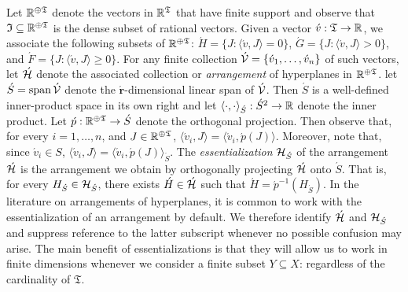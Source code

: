 \documentclass[12pt,a4paper,twoside]{article}
\newcommand{\spann}{\operatorname{span}}
\newcommand{\mbbtpp}{{\mathfrak{T}}}
\newcommand{\mbbjpp}{\mathfrak{I}}
\begin{document}
\begin{appendices}
Let $\R^{\oplus\mbbtpp}$ denote the vectors in $\R^{\mbbtpp}$ that have finite
support and observe that $\mbbjpp \subseteq \R^{\oplus\mbbtpp}$ is the dense
subset of rational vectors.  Given a vector $\acute{v}: \mbbtpp \rightarrow
\R$, we associate the following subsets of $\R^{\oplus\mbbtpp}$: $\acute H =
\{J : \langle \acute v , J \rangle = 0 \}$, $\acute G = \{J : \langle \acute v,
J \rangle > 0\}$, and $\acute F = \{J : \langle \acute v, J \rangle \geq 0\}$.
For any finite collection $\acute{\mathcal V} = \{\acute{v}_1, \dots, \acute{v}_n\}$
of such vectors, let $\acute{\mathcal H}$ denote the associated collection or
\emph{arrangement} of hyperplanes in $\R^{\oplus\mbbtpp}$. let $\acute{S} =
\spann \acute{\mc V}$ denote the $\acute{\mathbf{r}}$-dimensional linear span
of $\acute{\mathcal V}$. Then $\acute S$ is a well-defined inner-product space in
its own right and let $\langle \cdot , \cdot \rangle_{\acute{S}}: \acute{S}^2
\rightarrow \mathbb R$ denote the inner product. Let $\acute{p}: \R^{\oplus\mbbtpp}
\rightarrow \acute{S}$ denote the orthogonal projection. Then observe that, for
every $i = 1, \dots, n$, and $J \in \R^{\oplus\mbbtpp}$, $\langle \acute{v}_i,
J \rangle = \langle \acute{v}_i, \acute{p}(J)\rangle$.  Moreover, note that,
since $\acute{v}_i \in S$, $\langle \acute{v}_i, J \rangle = \langle
\acute{v}_i, \acute{p}(J) \rangle_{\acute{S}}$.  The \emph{essentialization}
${\mathcal H}_{\acute{S}}$ of the arrangement $\acute{\mathcal H}$ is the arrangement we
obtain by orthogonally projecting $\acute{\mathcal H}$ onto $\acute{S}$.  That is,
for every $H_{\acute{S}} \in {\mathcal H}_{\acute{S}}$, there exists $\acute{H} \in
\acute{\mathcal H}$ such that $\acute{H} = \acute{p}^{-1}(H_{\acute{S}})$.  In the
literature on arrangements of hyperplanes, it is common to work with the
essentialization of an arrangement by default.  We therefore identify
$\acute{\mathcal H}$ and $\mathcal{H}_{\acute{S}}$ and suppress reference to the latter
subscript whenever no possible confusion may arise. The main benefit of
essentializations is that they will allow us to work in finite dimensions
whenever we consider a finite subset $Y\subseteq X$: regardless of the
cardinality of $\mbbtpp$.

\end{appendices}
\end{document}
